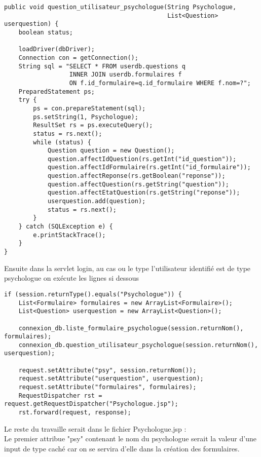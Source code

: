 \documentclass[12]{article}
\begin{document}
\begin{scriptsize}
\begin{lstlisting}
public void question_utilisateur_psychologue(String Psychologue,
											 List<Question> userquestion) {
	boolean status;

	loadDriver(dbDriver);
	Connection con = getConnection();
	String sql = "SELECT * FROM userdb.questions q 
				  INNER JOIN userdb.formulaires f 
				  ON f.id_formulaire=q.id_formulaire WHERE f.nom=?";
	PreparedStatement ps;
	try {
		ps = con.prepareStatement(sql);
		ps.setString(1, Psychologue);
		ResultSet rs = ps.executeQuery();
		status = rs.next();
		while (status) {
			Question question = new Question();
			question.affectIdQuestion(rs.getInt("id_question"));
			question.affectIdFormulaire(rs.getInt("id_formulaire"));
			question.affectReponse(rs.getBoolean("reponse"));
			question.affectQuestion(rs.getString("question"));
			question.affectEtatQuestion(rs.getString("reponse"));
			userquestion.add(question);
			status = rs.next();
		}
	} catch (SQLException e) {
		e.printStackTrace();
	}
}

\end{lstlisting}
\end{scriptsize}



\newpage

Ensuite dans la servlet login, au cas ou le type l'utilisateur identifié est de type psychologue on exécute les lignes si dessous

\begin{scriptsize}
\begin{lstlisting}
if (session.returnType().equals("Psychologue")) {
	List<Formulaire> formulaires = new ArrayList<Formulaire>();
	List<Question> userquestion = new ArrayList<Question>();
	
	connexion_db.liste_formulaire_psychologue(session.returnNom(), formulaires);
	connexion_db.question_utilisateur_psychologue(session.returnNom(), userquestion);
	
	request.setAttribute("psy", session.returnNom());
	request.setAttribute("userquestion", userquestion);
	request.setAttribute("formulaires", formulaires);
	RequestDispatcher rst = request.getRequestDispatcher("Psychologue.jsp");
	rst.forward(request, response);
\end{lstlisting}
\end{scriptsize}



Le reste du travaille serait dans le fichier Psychologue.jsp :\\
Le premier attribue "psy" contenant le nom du psychologue serait la valeur d'une input de type caché car on se servira d'elle dans la création des formulaires.\\
\end{document}
